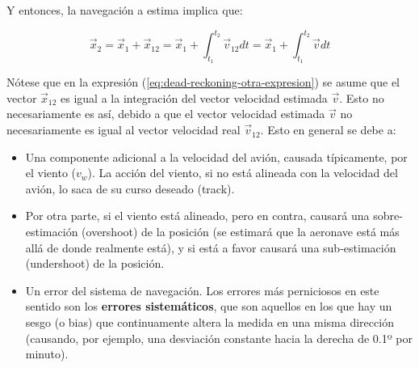 Y entonces, la navegaci\'on a estima implica que:

\begin{equation}
  \label{eq:dead-reckoning-otra-expresion}
\vec x_2 = \vec x_1 + \vec x_{12} = \vec x_1 + \int_{t_1}^{t_2} \vec v_{12} dt = \vec x_1 + \int_{t_1}^{t_2} \vec v dt   
\end{equation}

N\'otese que en la expresi\'on (\ref{eq:dead-reckoning-otra-expresion}) se asume que el vector $\vec x_{12}$ es igual a la integraci\'on del vector velocidad estimada $\vec v$. Esto no necesariamente es as\'i, debido a que el vector velocidad estimada $\vec v$ no necesariamente es igual al vector velocidad real $\vec v_{12}$. Esto en general se debe a:

\begin{minipage}[b]{0.70\linewidth}
  \begin{itemize}
  \item Una componente adicional a la velocidad del avi\'on, causada
    t\'ipicamente, por el viento ($v_w$). La acci\'on del viento, si
    no est\'a alineada con la velocidad del avi\'on, lo saca de su
    curso deseado (track).

  \item Por otra parte, si el viento est\'a alineado, pero en contra,
    causar\'a una sobre-estimaci\'on (overshoot) de la posici\'on (se
    estimar\'a que la aeronave est\'a m\'as all\'a de donde realmente
    est\'a), y si est\'a a favor causar\'a una sub-estimaci\'on
    (undershoot) de la posici\'on.

  \item Un error del sistema de navegaci\'on. Los errores m\'as
    perniciosos en este sentido son los \textbf{errores
      sistem\'aticos}, que son aquellos en los que hay un sesgo (o
    bias) que continuamente altera la medida en una misma direcci\'on
    (causando, por ejemplo, una desviaci\'on constante hacia la
    derecha de 0.1º por minuto).

  \end{itemize}
\end{minipage}
